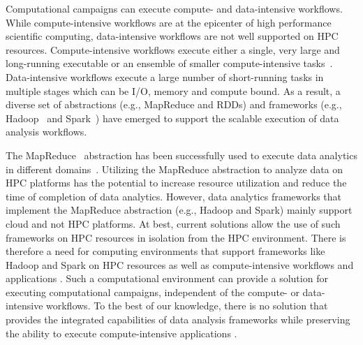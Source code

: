 Computational campaigns can execute compute- and data-intensive workflows. While
compute-intensive workflows are at the epicenter of high performance scientific
computing, data-intensive workflows are not well supported on HPC resources.
Compute-intensive workflows execute either a single, very large and long-running
executable or an ensemble of smaller compute-intensive
tasks~\cite{balasubramanian2018harnessing}. Data-intensive workflows execute a
large number of short-running tasks in multiple stages which can be I/O, memory
and compute bound. As a result, a diverse set of abstractions (e.g., MapReduce
and RDDs)
and frameworks (e.g., Hadoop~\cite{hadoop} and Spark~\cite{zaharia2010spark})
have emerged to support the scalable execution of data analysis
workflows.



The MapReduce~\cite{dean2004mapreduce} abstraction has been successfully used to
execute data analytics in different domains~\cite{hellerstein2012science}.
Utilizing the MapReduce abstraction to analyze data on HPC platforms has the
potential to increase resource utilization and reduce the time of completion of
data analytics. However, data analytics frameworks that implement the MapReduce
abstraction (e.g., Hadoop and Spark) mainly support cloud and not HPC platforms.
At best, current solutions allow the use of such frameworks on HPC resources in
isolation from the HPC environment. There is therefore a need for computing
environments  that support
frameworks like Hadoop and Spark on HPC resources as well as compute-intensive
workflows and applications . Such a computational environment can provide a solution
for executing computational campaigns, independent of the compute- or
data-intensive workflows. To the best of our knowledge, there is no solution
that provides the integrated capabilities of data analysis frameworks while
preserving the ability to execute compute-intensive applications .

